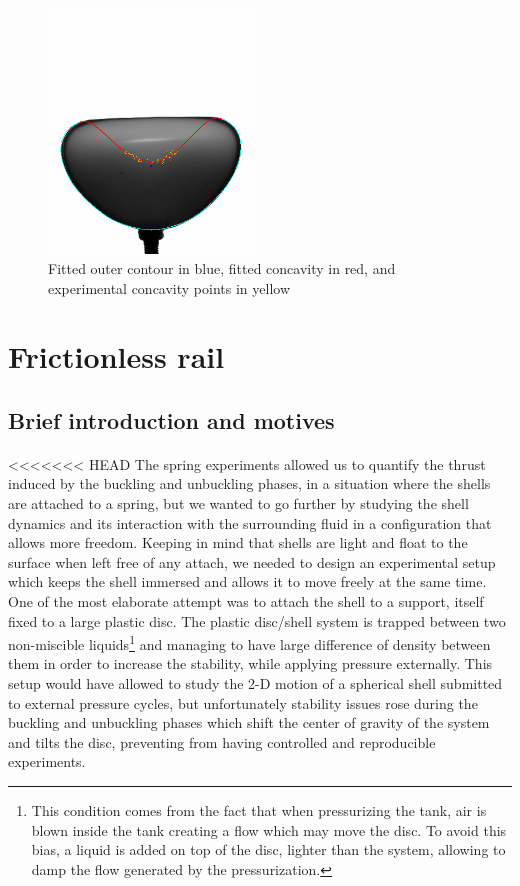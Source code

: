 \begin{figure}[H] %
	\centering%
  \includegraphics[width=0.48\textwidth]{figures/Chapter_1/outer_contour_complete.png}
	\caption{Fitted outer contour in blue, fitted concavity in red, and experimental concavity points in yellow}
	\label{fig:fit_complet}
\end{figure}
\newpage
\section{Frictionless rail}
\subsection{Brief introduction and motives}
\paragraph{}
<<<<<<< HEAD
The spring experiments allowed us to quantify the thrust induced by the buckling and unbuckling phases, in a situation where the shells are attached to a spring, but we wanted to go further by studying the shell dynamics and its interaction with the surrounding fluid in a configuration that allows more freedom. Keeping in mind that shells are light and float to the surface when left free of any attach, we needed to design an experimental setup which keeps the shell immersed and allows it to move freely at the same time.  One of the most elaborate attempt was to attach the shell to a support, itself fixed to a large plastic disc. The plastic disc/shell system is trapped between two non-miscible liquids\footnote{This condition comes from the fact that when pressurizing the tank, air is blown inside the tank creating a flow which may move the disc. To avoid this bias, a liquid is added on top of the disc, lighter than the system, allowing to damp the flow generated by the pressurization.} and managing to have large difference of density between them in order to increase the stability, while applying pressure externally. This setup would have allowed to study the 2-D motion of a spherical shell submitted to external pressure cycles, but unfortunately stability issues rose during the buckling and unbuckling phases which shift the center of gravity of the system and tilts the disc, preventing from having controlled and reproducible experiments.
